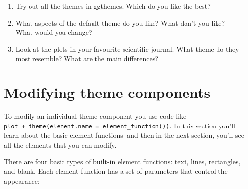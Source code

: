 \begin{enumerate}
\def\labelenumi{\arabic{enumi}.}
\item
  Try out all the themes in ggthemes. Which do you like the best?
\item
  What aspects of the default theme do you like? What don't you like?\\
  What would you change?
\item
  Look at the plots in your favourite scientific journal. What theme do
  they most resemble? What are the main differences?
\end{enumerate}

\section{Modifying theme components}\label{modifying-theme-components}

To modify an individual theme component you use code like
\texttt{plot\ +\ theme(element.name\ =\ element\_function())}. In this
section you'll learn about the basic element functions, and then in the
next section, you'll see all the elements that you can modify.

There are four basic types of built-in element functions: text, lines,
rectangles, and blank. Each element function has a set of parameters
that control the appearance:

